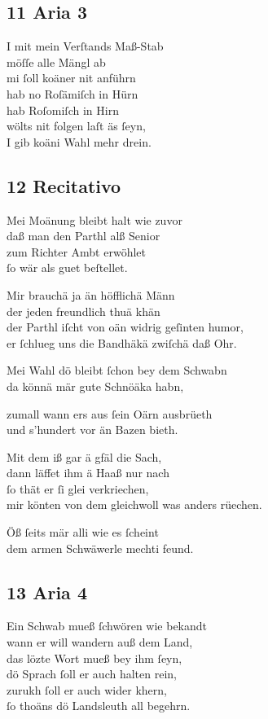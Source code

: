 \documentclass{ees}
\newenvironment{lyrics}[1]{%
  \subsection{#1}\nopagebreak%
  \begin{lyricslist}%
  \let\voice\item%
}{%
  \end{lyricslist}%
}
\begin{document}
\begin{lyrics}{11 Aria 3}
  \voice[Barthlme]
  I mit mein Verſtands Maß-Stab\\
  möſſe alle Mängl ab\\
  mi ſoll koäner nit anführn\\
  hab no Roſämiſch in Hürn\\
  hab Roſomiſch in Hirn\\
  wölts nit folgen laſt äs ſeyn,\\
  I gib koäni Wahl mehr drein.
\end{lyrics}

\clearpage
\begin{lyrics}{12 Recitativo}
  \voice[Schullmeiſter]
  Mei Moänung bleibt halt wie zuvor\\
  daß man den Parthl alß Senior\\
  zum Richter Ambt erwöhlet\\
  ſo wär als guet beſtellet.

  \voice[Schwabnwürth]
  Mir brauchä ja än höfflichä Männ\\
  der jeden freundlich thuä khän\\
  der Parthl iſcht von oän widrig geſinten humor,\\
  er ſchlueg uns die Bandhäkä zwiſchä daß Ohr.

  \voice[Schnepfendrekh]
  Mei Wahl dö bleibt ſchon bey dem Schwabn\\
  da könnä mär gute Schnöäka habn,

  \voice[Barthlme]
  zumall wann ers aus ſein Oärn ausbrüeth\\
  und s’hundert vor än Bazen bieth.

  \voice[Schullmeiſter]
  Mit dem iß gar ä gfäl die Sach,\\
  dann läffet ihm ä Haaß nur nach\\
  ſo thät er ſi glei verkriechen,\\
  mir könten von dem gleichwoll was anders rüechen.

  \voice[Schnepfendrekh]
  Öß ſeits mär alli wie es ſcheint\\
  dem armen Schwäwerle mechti feund.
\end{lyrics}

\begin{lyrics}{13 Aria 4}
  \voice[Schnepfendrekh]
  Ein Schwab mueß ſchwören wie bekandt\\
  wann er will wandern auß dem Land,\\
  das lözte Wort mueß bey ihm ſeyn,\\
  dö Sprach ſoll er auch halten rein,\\
  zurukh ſoll er auch wider khern,\\
  ſo thoäns dö Landsleuth all begehrn.
\end{lyrics}
\end{document}
